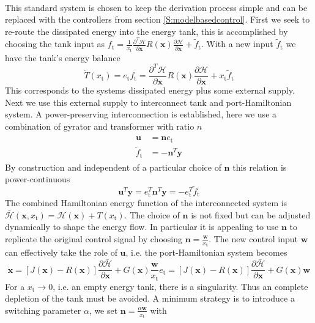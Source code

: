 \documentclass[a4paper,twoside, openright,12pt]{report}
\newcommand{\f}[1]{\boldsymbol{#1}}
\newcommand{\g}[1]{\text{#1}}
\begin{document}
{\begin{eqnarray}
\end{eqnarray}
This standard system is chosen to keep the derivation process simple and can be replaced with the controllers from section \ref{S:modelbasedcontrol}.
First we seek to re-route the dissipated energy into the energy tank, this is accomplished by choosing the tank input as $f_\g{t} = \frac{1}{x_\g{t}}\frac{\partial^T \mathcal{H}}{\partial \f{x}}R(\f{x})\frac{\partial \mathcal{H}}{\partial \f{x}} + \tilde{f}_\g{t}$. With a new input $\tilde{f}_\g{t}$ we have the tank's energy balance
\begin{equation}\label{EQ:tankpower}
\dot{T}(x_\g{t})=e_\g{t}f_\g{t} = \frac{\partial^T \mathcal{H}}{\partial \f{x}}R(\f{x})\frac{\partial \mathcal{H}}{\partial \f{x}} + x_\g{t}\tilde{f}_\g{t}
\end{equation}
This corresponds to the systems dissipated energy plus some external supply. Next we use this external supply to interconnect tank and port-Hamiltonian system. A power-preserving interconnection is established, here we use a combination of gyrator and transformer with ratio $n$
\begin{eqnarray}
\begin{aligned}
\f{u} &= \f{n}e_\g{t} \\
\tilde{f}_\g{t} &= -\f{n}^T\f{y}
\end{aligned}
\end{eqnarray}
By construction and independent of a particular choice of $\f{n}$ this relation is power-continuous
\begin{equation}
\f{u}^T\f{y} = e_\g{t}^T\f{n}^T\f{y} = -e_\g{t}^T\tilde{f}_\g{t}
\end{equation}
The combined Hamiltonian energy function of the interconnected system is $\bar{\mathcal{H}}(\f{x},x_\g{t})=\mathcal{H}(\f{x})+T(x_\g{t})$. The choice of $\f{n}$ is not fixed but can be adjusted dynamically to shape the energy flow. In particular it is appealing to use $\f{n}$ to replicate the original control signal by choosing $\f{n} = \frac{\f{w}}{x_\g{t}}$. The new control input $\f{w}$ can effectively take the role of $\f{u}$, i.e. the port-Hamiltonian system becomes
\begin{equation}
\dot{\f{x}} = [J(\f{x}) - R(\f{x})] \frac{\partial \bar{\mathcal{H}}}{\partial \f{x}} + G(\f{x})\frac{\f{w}}{x_\g{t}}e_\g{t} = [J(\f{x}) - R(\f{x})] \frac{\partial \bar{\mathcal{H}}}{\partial \f{x}} + G(\f{x})\f{w}
\end{equation}
For a $x_\g{t}\rightarrow0$, i.e. an empty energy tank, there is a singularity. Thus an complete depletion of the tank must be avoided. A minimum strategy is to introduce a switching parameter $\alpha$, we set $\f{n}=\frac{\alpha \f{w}}{x_\g{t}}$ with 
}
\end{document}
